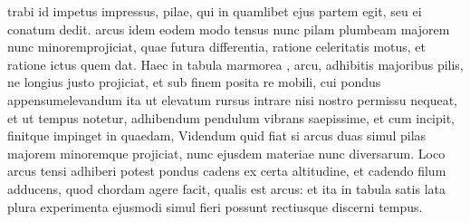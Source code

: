 trabi id impetus\protect{} impressus, pilae\protect{}, qui in quamlibet ejus partem egit, seu ei conatum\protect{} dedit.  arcus\protect{} idem eodem modo tensus nunc pilam\protect{} plumbeam majorem nunc minoremprojiciat, quae futura differentia, ratione celeritatis\protect{} motus, et ratione ictus\protect{} quem dat. Haec in tabula marmorea , arcu, adhibitis majoribus pilis, ne longius justo projiciat, et sub finem posita re mobili, cui pondus appensumelevandum ita ut elevatum rursus intrare nisi nostro permissu nequeat, et ut tempus notetur, adhibendum pendulum vibrans saepissime, et cum incipit, finitque impinget in quaedam,\protect{} Videndum quid fiat si arcus\protect{} duas simul pilas\protect{} majorem minoremque projiciat, nunc ejusdem materiae nunc diversarum. Loco arcus\protect{} tensi adhiberi potest pondus cadens ex certa altitudine, et cadendo filum adducens, quod chordam agere facit, qualis est arcus\protect{}: et ita in tabula satis lata plura experimenta ejusmodi simul fieri possunt rectiusque discerni tempus.
\pend


